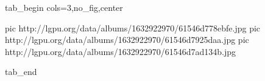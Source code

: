  
 
 
 
 

\ifcmt
  tab_begin cols=3,no_fig,center

     pic http://lgpu.org/data/albums/1632922970/61546d778ebfe.jpg
		 pic http://lgpu.org/data/albums/1632922970/61546d7925daa.jpg
		 pic http://lgpu.org/data/albums/1632922970/61546d7ad134b.jpg

  tab_end
\fi
